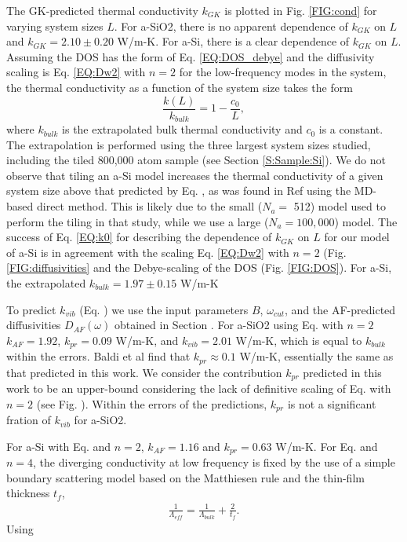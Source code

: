 \documentclass[aps,prb,twocolumn,superscriptaddress,footinbib,amsmath,amssymb,floatfix]{revtex4}
\begin{document}
The GK-predicted thermal conductivity $k_{GK}$ is plotted in 
Fig. \ref{FIG:cond} for 
varying system sizes $L$. For a-SiO2, there is no apparent dependence 
of $k_{GK}$ on $L$ and $k_{GK}=2.10 \pm 0.20$ W/m-K. 
For a-Si, there is a clear dependence of $k_{GK}$ on 
$L$. Assuming the DOS has the form of Eq. \eqref{EQ:DOS_debye} 
and the diffusivity scaling 
is Eq. \eqref{EQ:Dw2} with $n=2$ 
for the low-frequency modes in the system, 
the thermal conductivity as a function of the system size 
takes the form
\begin{equation}\label{EQ:k0}
\frac{k(L)}{k_{bulk}} = 1 - \frac{c_0}{L},
\end{equation}
where $k_{bulk}$ is the extrapolated bulk thermal conductivity and $c_0$ 
is a constant.\cite{shiomi_thermal_2011,esfarjani_heat_2011} 
The extrapolation is performed using the three largest 
system sizes studied, including the tiled 800,000 atom sample (see 
Section \ref{S:Sample:Si}). 
We do not observe that tiling an a-Si model increases 
the thermal 
conductivity of a given system size above that predicted by Eq. , as 
was found in Ref  using the MD-based 
direct method. This is likely due to the 
small ($N_a = $ 512) model used to perform the tiling in that study, 
while we use a large ($N_a = 100,000$) model. 
The success of 
Eq. \eqref{EQ:k0} for describing the dependence of $k_{GK}$ on 
$L$ for our model of a-Si is in 
agreement with the scaling Eq. \eqref{EQ:Dw2} with $n=2$ 
(Fig. \ref{FIG:diffusivities} 
and the Debye-scaling of the DOS (Fig. \ref{FIG:DOS}). 
For a-Si, the extrapolated $k_{bulk} = 1.97 \pm 0.15$ W/m-K

To predict $k_{vib}$ (Eq. ) we use the input parameters 
$B$, $\omega_{cut}$, and the AF-predicted diffusivities 
$D_{AF}(\omega)$ obtained in Section . 
For a-SiO2 using Eq. with $n=2$ $k_{AF} = 1.92$, 
$k_{pr} = 0.09$ W/m-K, and 
$k_{vib} = 2.01$ W/m-K, which is equal to $k_{bulk}$ within 
the errors.  
Baldi et al find that $k_{pr}\approx0.1$ W/m-K, essentially 
the same as that predicted in this work. We consider the contribution 
$k_{pr}$ predicted in this work to be an upper-bound considering 
the lack of definitive scaling of Eq. with $n=2$ (see Fig. ). 
Within the errors of the predictions, $k_{pr}$ is not a significant 
fration of $k_{vib}$ for a-SiO2. 

For a-Si with Eq. and $n=2$, 
$k_{AF} = 1.16$ and $k_{pr} = 0.63$ W/m-K. For Eq. and $n=4$, the 
diverging conductivity at low frequency is fixed by the 
use of a simple boundary scattering model based on the Matthiesen 
rule and the thin-film thickness $t_f$,\cite{sellan_cross-plane_2010} 
\begin{equation}\label{EQ:LambdaMatth}
\begin{split}
\frac{1}{\Lambda_{eff}} = \frac{1}{\Lambda_{bulk}} + 
\frac{2}{t_f}.
\end{split}
\end{equation}
Using 
\end{document}
